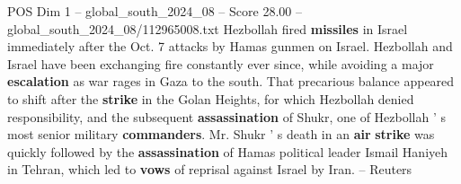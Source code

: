 \begin{textsample}{POS Dim 1 – global\_south\_2024\_08 – Score 28.00 – global\_south\_2024\_08/112965008.txt}
Hezbollah fired \textbf{missiles} in Israel immediately after the Oct. 7 attacks by Hamas gunmen on Israel.
Hezbollah and Israel have been exchanging fire constantly ever since, while avoiding a major \textbf{escalation} as war rages in Gaza to the south.
That precarious balance appeared to shift after the \textbf{strike} in the Golan Heights, for which Hezbollah denied responsibility, and the subsequent \textbf{assassination} of Shukr, one of Hezbollah ' s most senior military \textbf{commanders}.
Mr.
Shukr ' s death in an \textbf{air} \textbf{strike} was quickly followed by the \textbf{assassination} of Hamas political leader Ismail Haniyeh in Tehran, which led to \textbf{vows} of reprisal against Israel by Iran. -- Reuters

\end{textsample}
